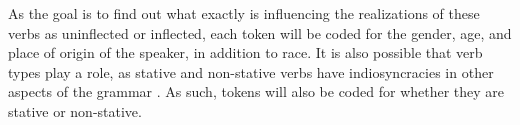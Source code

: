 \documentclass{article}
\begin{document}
      As the goal is to find out what exactly is influencing the realizations of these verbs as uninflected or inflected, each token will be coded for the gender, age, and place of origin of the speaker, in addition to race.
      It is also possible that verb types play a role, as stative and non-stative verbs have indiosyncracies in other aspects of the grammar \parencite[pp.~252-253]{klingler_if_2003}.
      As such, tokens will also be coded for whether they are stative or non-stative.

\end{document}
